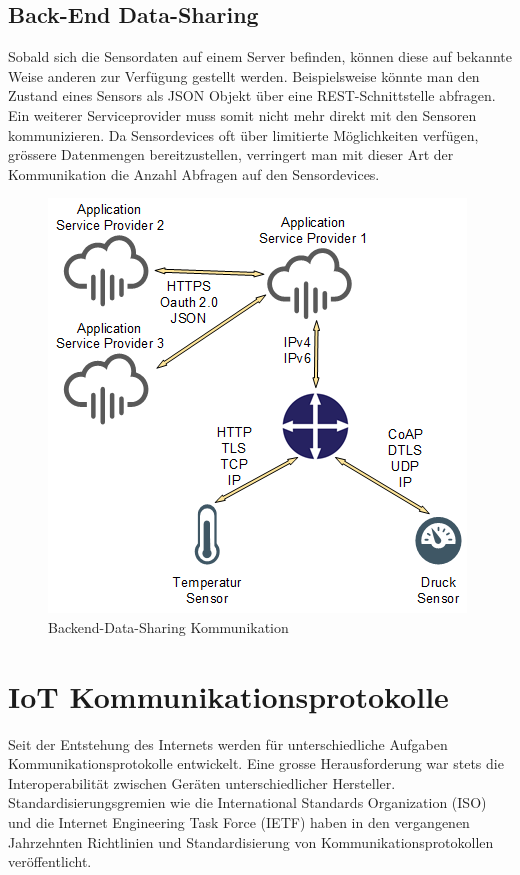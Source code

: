 \subsection{Back-End Data-Sharing}
Sobald sich die Sensordaten auf einem Server befinden, können diese auf bekannte Weise anderen zur Verfügung gestellt werden. Beispielsweise könnte man den Zustand eines Sensors als JSON Objekt über eine REST-Schnittstelle abfragen. Ein weiterer Serviceprovider muss somit nicht mehr direkt mit den Sensoren kommunizieren. Da Sensordevices oft über limitierte Möglichkeiten verfügen, grössere Datenmengen bereitzustellen, verringert man mit dieser Art der Kommunikation die Anzahl Abfragen auf den Sensordevices. 
\begin{figure}[H]
\centering
\includegraphics[scale=0.8]{images/backend-data-sharing.png}
\caption{Backend-Data-Sharing Kommunikation}
\end{figure}

\newpage

\section{IoT Kommunikationsprotokolle}
Seit der Entstehung des Internets werden für unterschiedliche Aufgaben Kommunikationsprotokolle entwickelt. Eine grosse Herausforderung war stets die Interoperabilität zwischen Geräten unterschiedlicher Hersteller. Standardisierungsgremien wie die International Standards Organization (ISO) und die Internet Engineering Task Force (IETF) haben in den vergangenen Jahrzehnten Richtlinien und Standardisierung von Kommunikationsprotokollen veröffentlicht. 

